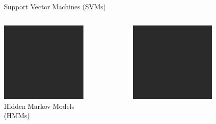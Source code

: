 \documentclass[xcolor={svgnames,table},10pt,fleqn]{beamer}
\begin{document}
\begin{frame}
\begin{columns}
\begin{column}{.5\textwidth}
\begin{figure}
                \caption{Support Vector Machines (SVMs)}
            \end{figure}
        \end{column}
    \end{columns}
    \begin{columns}
        \begin{column}{.5\textwidth}
            \begin{figure}
            \includegraphics[height=0.2\textheight, width=\linewidth, keepaspectratio]{todo}
                \caption{Hidden Markov Models (HMMs)}
            \end{figure}
        \end{column}
        \begin{column}{.5\textwidth}
            \begin{figure}
            \includegraphics[height=0.2\textheight, width=\linewidth, keepaspectratio]{todo}

\end{figure}
\end{column}
\end{columns}
\end{frame}
\end{document}
